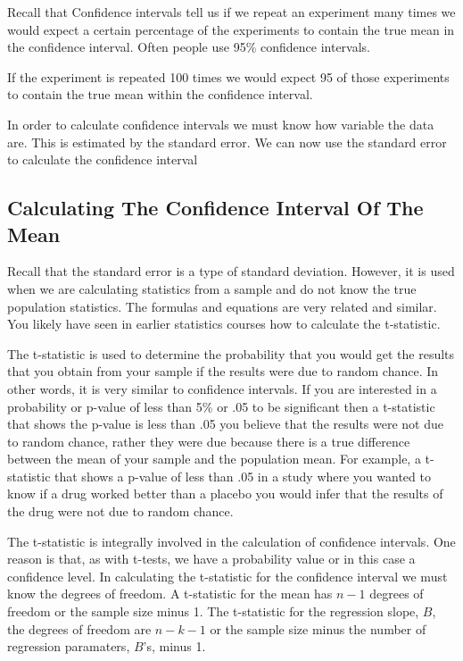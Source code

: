 \documentclass[]{book}
\theoremstyle{definition}
\theoremstyle{definition}
\theoremstyle{definition}
\theoremstyle{remark}
\begin{document}
Recall that Confidence intervals tell us if we repeat an experiment many
times we would expect a certain percentage of the experiments to contain
the true mean in the confidence interval. Often people use 95\%
confidence intervals.

If the experiment is repeated 100 times we would expect 95 of those
experiments to contain the true mean within the confidence interval.

In order to calculate confidence intervals we must know how variable the
data are. This is estimated by the standard error. We can now use the
standard error to calculate the confidence interval

\hypertarget{calculating-the-confidence-interval-of-the-mean}{%
\subsection{Calculating The Confidence Interval Of The
Mean}\label{calculating-the-confidence-interval-of-the-mean}}

Recall that the standard error is a type of standard deviation. However,
it is used when we are calculating statistics from a sample and do not
know the true population statistics. The formulas and equations are very
related and similar. You likely have seen in earlier statistics courses
how to calculate the t-statistic.

The t-statistic is used to determine the probability that you would get
the results that you obtain from your sample if the results were due to
random chance. In other words, it is very similar to confidence
intervals. If you are interested in a probability or p-value of less
than 5\% or .05 to be significant then a t-statistic that shows the
p-value is less than .05 you believe that the results were not due to
random chance, rather they were due because there is a true difference
between the mean of your sample and the population mean. For example, a
t-statistic that shows a p-value of less than .05 in a study where you
wanted to know if a drug worked better than a placebo you would infer
that the results of the drug were not due to random chance.

The t-statistic is integrally involved in the calculation of confidence
intervals. One reason is that, as with t-tests, we have a probability
value or in this case a confidence level. In calculating the t-statistic
for the confidence interval we must know the degrees of freedom. A
t-statistic for the mean has \(n-1\) degrees of freedom or the sample
size minus 1. The t-statistic for the regression slope, \(B\), the
degrees of freedom are \(n-k-1\) or the sample size minus the number of
regression paramaters, \(B\)'s, minus 1.
\end{document}
